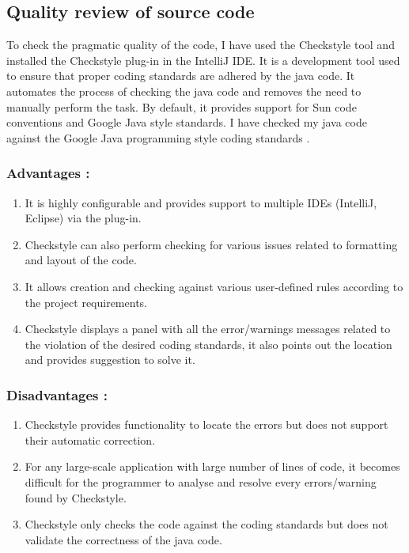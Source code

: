 \documentclass[12pt, a4paper]{article}
\begin{document}
\newpage
\subsection{Quality review of source code}
To check the pragmatic quality of the code, I have used the Checkstyle tool and installed the Checkstyle plug-in in the IntelliJ IDE. It is a development tool used to ensure that proper coding standards are adhered by the java code. It automates the process of checking the java code and removes the need to manually perform the task. By default, it provides support for Sun code conventions and Google Java style standards. I have checked my java code against the Google Java programming style coding standards \cite{Checkstyle} .

\subsubsection{Advantages : }
\begin{enumerate}
    \item It is highly configurable and provides support to multiple IDEs (IntelliJ, Eclipse) via the plug-in.
    \item Checkstyle can also perform checking for various issues related to formatting and layout of the code.
    \item It allows creation and checking against various user-defined rules according to the project requirements.
    \item Checkstyle displays a panel with all the error/warnings messages related to the violation of the desired coding standards, it also points out the location and provides suggestion to solve it.
\end{enumerate}

\subsubsection{Disadvantages : }
\begin{enumerate}
    \item Checkstyle provides functionality to locate the errors but does not support their automatic correction.
    \item For any large-scale application with large number of lines of code, it becomes difficult for the programmer to analyse and resolve every errors/warning found by Checkstyle.
    \item Checkstyle only checks the code against the coding standards but does not validate the correctness of the java code.
\end{enumerate}
\end{document}
